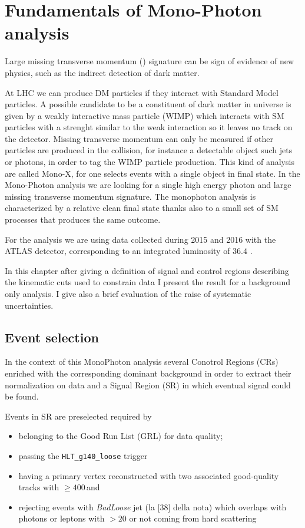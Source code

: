 \chapter{Fundamentals of Mono-Photon analysis}
Large missing transverse momentum (\met) signature can be sign of evidence of new physics, such as the indirect detection of dark matter.

At LHC we can produce DM particles if they interact with Standard Model particles. A possible candidate to be a constituent of dark matter in universe is given by a weakly interactive mass particle (WIMP) which interacts with SM particles with a strenght similar to the weak interaction so it leaves no track on the detector. Missing transverse momentum can only be measured  if other particles are produced in the collision, for instance a detectable object such jets or photons, in order to tag the WIMP particle production. This kind of analysis are called Mono-X, for one selects events with a single object in final state. In the Mono-Photon analysis we are looking for a single high energy photon and large missing transverse momentum signature. The monophoton analysis is characterized by a relative clean final state thanks also to a small set of SM processes that produces the same outcome.

For the analysis we are using data collected during 2015 and 2016 with the ATLAS detector, corresponding to an integrated luminosity of $36.4$ \ifb.

In this chapter after giving a definition of signal and control regions describing the kinematic cuts used to constrain data I present the result for a background only analysis. I give also a brief evaluation of the raise of systematic uncertainties.

\section{Event selection}
In the context of this MonoPhoton analysis several Conotrol Regions (CRs) enriched with the corresponding dominant background in order to extract their normalization on data and a Signal Region (SR) in which eventual signal could be found.

Events in SR are preselected required by
\begin{itemize}
\item belonging to the Good Run List (GRL) for data quality;
\item passing the  \verb!HLT_g140_loose! trigger
\item having a primary vertex reconstructed with two associated good-quality tracks with \pt $\ge 400 \,$\MeV and 
\item rejecting events with {\itshape BadLoose} jet (la [38] della nota) which overlaps with photons or leptons with \pt$> 20$ \GeV or not coming from hard scattering
\end{itemize}

